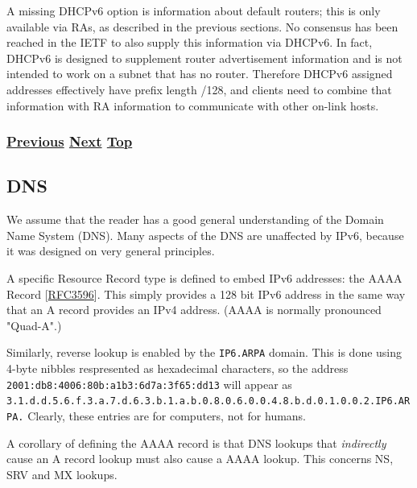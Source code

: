 \documentclass[
]{article}
\begin{document}
A missing DHCPv6 option is information about default routers; this is
only available via RAs, as described in the previous sections. No
consensus has been reached in the IETF to also supply this information
via DHCPv6. In fact, DHCPv6 is designed to supplement router
advertisement information and is not intended to work on a subnet that
has no router. Therefore DHCPv6 assigned addresses effectively have
prefix length /128, and clients need to combine that information with RA
information to communicate with other on-link hosts.

\subsubsection{\texorpdfstring{\hyperref[auto-configuration]{Previous}
\hyperref[dns]{Next}
\hyperref[ipv6-basic-technology]{Top}}{Previous Next Top}}\label{previous-next-top-12}

\pagebreak

\subsection{DNS}\label{dns}

We assume that the reader has a good general understanding of the Domain
Name System (DNS). Many aspects of the DNS are unaffected by IPv6,
because it was designed on very general principles.

A specific Resource Record type is defined to embed IPv6 addresses: the
AAAA Record
{[}\href{https://www.rfc-editor.org/info/rfc3596}{RFC3596}{]}. This
simply provides a 128 bit IPv6 address in the same way that an A record
provides an IPv4 address. (AAAA is normally pronounced "Quad-A".)

Similarly, reverse lookup is enabled by the \texttt{IP6.ARPA} domain.
This is done using 4-byte nibbles respresented as hexadecimal
characters, so the address
\texttt{2001:db8:4006:80b:a1b3:6d7a:3f65:dd13} will appear as
\texttt{3.1.d.d.5.6.f.3.a.7.d.6.3.b.1.a.b.0.8.0.6.0.0.4.8.b.d.0.1.0.0.2.IP6.ARPA.}
Clearly, these entries are for computers, not for humans.

A corollary of defining the AAAA record is that DNS lookups that
\emph{indirectly} cause an A record lookup must also cause a AAAA
lookup. This concerns NS, SRV and MX lookups.
\end{document}
